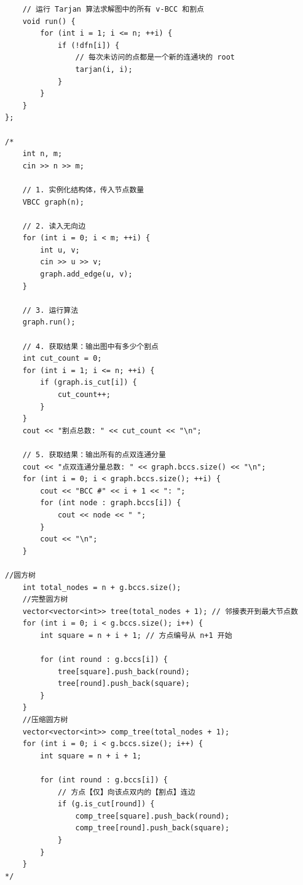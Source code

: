 \documentclass[10pt, a4paper, twocolumn]{article} %
\begin{document}
\begin{lstlisting}
    // 运行 Tarjan 算法求解图中的所有 v-BCC 和割点
    void run() {
        for (int i = 1; i <= n; ++i) {
            if (!dfn[i]) {
                // 每次未访问的点都是一个新的连通块的 root
                tarjan(i, i);
            }
        }
    }
};

/*
    int n, m;
    cin >> n >> m;

    // 1. 实例化结构体，传入节点数量
    VBCC graph(n);

    // 2. 读入无向边
    for (int i = 0; i < m; ++i) {
        int u, v;
        cin >> u >> v;
        graph.add_edge(u, v);
    }

    // 3. 运行算法
    graph.run();

    // 4. 获取结果：输出图中有多少个割点
    int cut_count = 0;
    for (int i = 1; i <= n; ++i) {
        if (graph.is_cut[i]) {
            cut_count++;
        }
    }
    cout << "割点总数: " << cut_count << "\n";

    // 5. 获取结果：输出所有的点双连通分量
    cout << "点双连通分量总数: " << graph.bccs.size() << "\n";
    for (int i = 0; i < graph.bccs.size(); ++i) {
        cout << "BCC #" << i + 1 << ": ";
        for (int node : graph.bccs[i]) {
            cout << node << " ";
        }
        cout << "\n";
    }

//圆方树
    int total_nodes = n + g.bccs.size(); 
    //完整圆方树
    vector<vector<int>> tree(total_nodes + 1); // 邻接表开到最大节点数
    for (int i = 0; i < g.bccs.size(); i++) {
        int square = n + i + 1; // 方点编号从 n+1 开始
        
        for (int round : g.bccs[i]) {
            tree[square].push_back(round);
            tree[round].push_back(square);
        }
    }
    //压缩圆方树
    vector<vector<int>> comp_tree(total_nodes + 1); 
    for (int i = 0; i < g.bccs.size(); i++) {
        int square = n + i + 1; 
        
        for (int round : g.bccs[i]) {
            // 方点【仅】向该点双内的【割点】连边
            if (g.is_cut[round]) {
                comp_tree[square].push_back(round);
                comp_tree[round].push_back(square);
            }
        }
    }
*/
    \end{lstlisting}
\end{document}
